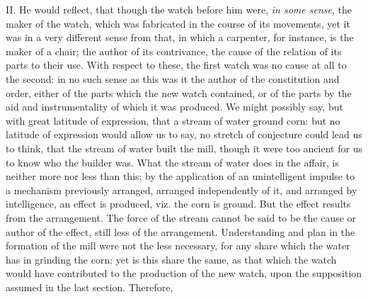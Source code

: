 II. He would reflect, that though the watch before him were,
\textit{in some sense}, the maker of the watch, which was fabricated
in the course of its movements, yet it was in a very different sense
from that, in which a carpenter, for instance, is the maker of a
chair; the author of its contrivance, the cause of the relation of its
parts to their use. With respect to these, the first watch was no
cause at all to the second: in no such sense as this was it the author
of the constitution and order, either  of the parts which the
new watch contained, or of the parts by the aid and instrumentality of
which it was produced. We might possibly say, but with great latitude
of expression, that a stream of water ground corn: but no latitude of
expression would allow us to say, no stretch of conjecture could lead
us to think, that the stream of water built the mill, though it were
too ancient for us to know who the builder was. What the stream of
water does in the affair, is neither more nor less than this; by the
application of an unintelligent impulse to a mechanism previously
arranged, arranged independently of it, and arranged by intelligence,
an effect is produced, viz. the corn is ground. But the effect results
from the arrangement. The force of the stream cannot be said to be the
cause or author of the effect, still less of the arrangement.
Understanding and plan in the formation of the mill were not the less
necessary, for any share which the water has in grinding the corn: yet
is this share the same, as that which the watch would have contributed
to the production of the new watch, upon the supposition assumed in
the last section. Therefore,

